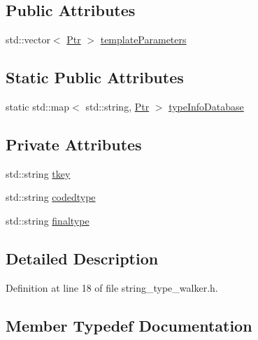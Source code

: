 \subsection*{Public Attributes}
\begin{DoxyCompactItemize}
\item 
std\+::vector$<$ \hyperlink{classsmacc_1_1introspection_1_1TypeInfo_aa6ffd9c39811d59f7c771941b7fad860}{Ptr} $>$ \hyperlink{classsmacc_1_1introspection_1_1TypeInfo_aed5166ab8bcd94489e7bc87deb01de5c}{template\+Parameters}
\end{DoxyCompactItemize}
\subsection*{Static Public Attributes}
\begin{DoxyCompactItemize}
\item 
static std\+::map$<$ std\+::string, \hyperlink{classsmacc_1_1introspection_1_1TypeInfo_aa6ffd9c39811d59f7c771941b7fad860}{Ptr} $>$ \hyperlink{classsmacc_1_1introspection_1_1TypeInfo_ab780c03206b824aaf338135d16b0eff4}{type\+Info\+Database}
\end{DoxyCompactItemize}
\subsection*{Private Attributes}
\begin{DoxyCompactItemize}
\item 
std\+::string \hyperlink{classsmacc_1_1introspection_1_1TypeInfo_a697dd505119258dba1224d10eea5b2bd}{tkey}
\item 
std\+::string \hyperlink{classsmacc_1_1introspection_1_1TypeInfo_a117d2b73994b78a6e4e81cdf7054912c}{codedtype}
\item 
std\+::string \hyperlink{classsmacc_1_1introspection_1_1TypeInfo_aa4010ed427e12db443e08ab16a3de243}{finaltype}
\end{DoxyCompactItemize}


\subsection{Detailed Description}


Definition at line 18 of file string\+\_\+type\+\_\+walker.\+h.



\subsection{Member Typedef Documentation}
